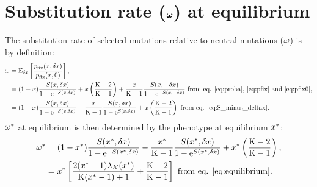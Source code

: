 \documentclass{article}
\begin{document}
\section*{Substitution rate ($\bm{\omega}$) at equilibrium}
The substitution rate of selected mutations relative to neutral mutations  ($\omega$) is by definition:
\begin{align}
\omega & = \operatorname{\mathbb{E}}_{\delta x} \left[ \frac{p_{\text{fix}}(x, \delta x)}{p_{\text{fix}}(x, 0)} \right], \\
 & = (1 - x) \frac{ S(x, \delta x)}{1 - \mathrm{e}^{-S(x, \delta x)}} + x \left(\frac{\text{K} - 2}{\text{K} - 1}\right) + \frac{x}{\text{K}-1} \frac{ S(x, -\delta x)}{1 - \mathrm{e}^{-S(x, -\delta x)}} \text{ from eq. \ref{eq:proba}, \ref{eq:pfix} and \ref{eq:pfix0}}, \\
 & = (1 - x) \frac{ S(x, \delta x)}{1 - \mathrm{e}^{-S(x, \delta x)}} - \frac{x}{\text{K}-1}  \frac{ S(x, \delta x)}{1 - \mathrm{e}^{S(x, \delta x)}} +  x \left(\frac{\text{K} - 2}{\text{K} - 1}\right) \text{ from eq. \ref{eq:S_minus_deltax}}.
\end{align}
$\omega^{*}$ at equilibrium is then determined by the phenotype at equilibrium $x^{*}$:
\begin{align}
\omega^{*} &= (1 - x^{*}) \frac{ S(x^{*}, \delta x)}{1 - \mathrm{e}^{-S(x^{*}, \delta x)}} - \frac{x^{*}}{\text{K}-1} \frac{ S(x^{*}, \delta x)}{1 - \mathrm{e}^{S(x^{*}, \delta x)}} + x^{*} \left(\frac{\text{K} - 2}{\text{K} - 1}\right) , \\
 &= x^{*} \left[ \frac{2 (x^{*}-1)  \lambda_{K}(x^{*}) }{\text{K} (x^{*}-1)+1} + \frac{\text{K} - 2}{\text{K} - 1}\right] \text{ from eq. \ref{eq:equilibrium}}.
\end{align}
\begin{center}
\end{center}
\end{document}
